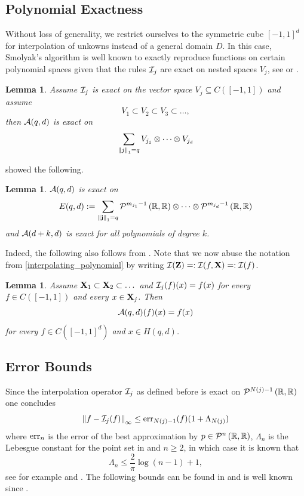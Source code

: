\documentclass[12pt, oneside]{amsart}
\newtheorem{lem}[thm]{Lemma}
\theoremstyle{definition}
\theoremstyle{remark}
\numberwithin{equation}{section}
\begin{document}
\subsection{Polynomial Exactness}
Without loss of generality, we restrict ourselves to the symmetric cube \([-1, 1]^d\) for interpolation of unkowns instead of a general domain \(D\). In this case, Smolyak's algorithm is well known to exactly reproduce functions on certain polynomial spaces given that the rules \(\cI_j\) are exact on nested spaces \(V_j\), see \cite{DELVOS198299} or \cite{novakRitter1996}.
\begin{lem}
	Assume \(\cI_j\) is exact on the vector space \(V_j \subseteq C([-1, 1])\) and assume \[
		V_1 \subset V_2 \subset V_3 \subset \dots,
	\]
	then \(\cA(q, d)\) is exact on \[
		\sum_{\norm[1]{j}=q} V_{j_1} \otimes \cdots \otimes V_{j_d}
	\]
\end{lem}
\cite{BarthelmannHighDim_2000} showed the following.
\begin{lem}
	\(\cA(q, d)\) is exact on \[
		E(q, d) \defn \sum_{\norm[1]{\bfj} = q} \pols[m_{j_1}-1]{\R, \R} \otimes \cdots \otimes \pols[m_{j_d}-1]{\R, \R}
	\]
	and \(\cA(d+k, d)\) is exact for all polynomials of degree \(k\).
\end{lem}
Indeed, the following also follows from \cite{BarthelmannHighDim_2000}. Note that we now abuse the notation from \ref{interpolating_polynomial} by writing \(\cI(\ZZ) \revdefn \cI(f, \XX) \revdefn \cI(f)\).
\begin{lem}
	Assume \(\XX_1 \subset \XX_2 \subset \dots\) and \(\cI_j(f)(x) = f(x)\) for every \(f \in C([-1, 1])\) and every \(x \in \XX_j\). Then \[
		\cA(q, d)(f)(x) = f(x)
	\]
	for every \(f \in C([-1, 1]^d)\) and \(x \in H(q, d)\).
\end{lem}

\subsection{Error Bounds}
Since the interpolation operator \(\cI_j\) as defined before is exact on \(\pols[N(j)-1]{\R, \R}\) one concludes \[
	\norm[\infty]{f - \cI_j(f)} \leq \err_{N(j)-1}(f)(1+\Lambda_{N(j)})
\]
where \(\err_n\) is the error of the best approximation by \(p \in \pols[n]{\R, \R}\), \(\Lambda_n\) is the Lebesgue constant for the point set in  and \(n \geq 2\), in which case it is known that \[
	\Lambda_n \leq \frac{2}{\pi} \log(n-1)+1,
\]
see for example \cite{zeller1966} and \cite{Dzjadyk1983}. The following bounds can be found in \cite{BarthelmannHighDim_2000} and is well known since \cite{smolyak1963, temlyakov1986, WASILKOWSKI19951}.
\end{document}
